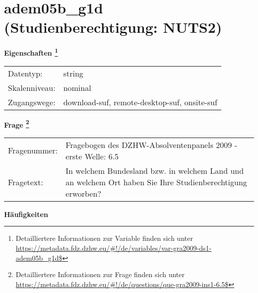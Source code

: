 
    \setcounter{footnote}{0}

    \vspace*{-1.8cm}
	\section{adem05b\_g1d (Studienberechtigung: NUTS2)}
	\label{section:adem05b_g1d}



    \vspace*{0.5cm}
    \noindent\textbf{Eigenschaften
	\footnote{Detailliertere Informationen zur Variable finden sich unter
		\url{https://metadata.fdz.dzhw.eu/\#!/de/variables/var-gra2009-ds1-adem05b_g1d$}}}\\
	\begin{tabularx}{\hsize}{@{}lX}
	Datentyp: & string \\
	Skalenniveau: & nominal \\
	Zugangswege: &
	  download-suf, 
	  remote-desktop-suf, 
	  onsite-suf
 \\
    \end{tabularx}



				\vspace*{0.5cm}
                \noindent\textbf{Frage
	                \footnote{Detailliertere Informationen zur Frage finden sich unter
		              \url{https://metadata.fdz.dzhw.eu/\#!/de/questions/que-gra2009-ins1-6.5$}}}\\
				\begin{tabularx}{\hsize}{@{}lX}
					Fragenummer: &
					  Fragebogen des DZHW-Absolventenpanels 2009 - erste Welle:
					  6.5
 \\
					Fragetext: & In welchem Bundesland bzw. in welchem Land und an welchem Ort haben Sie Ihre Studienberechtigung erworben? \\
				\end{tabularx}





        		\vspace*{0.5cm}
                \noindent\textbf{Häufigkeiten}

